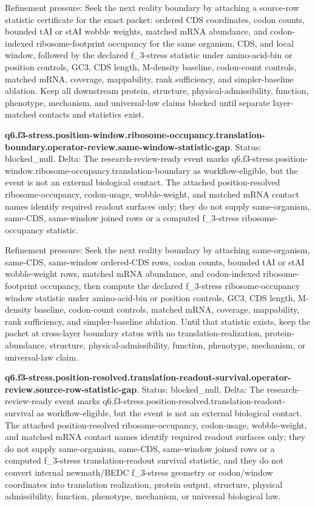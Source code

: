Refinement pressure: Seek the next reality boundary by attaching a source-row statistic certificate for the exact packet: ordered CDS coordinates, codon counts, bounded tAI or stAI wobble weights, matched mRNA abundance, and codon-indexed ribosome-footprint occupancy for the same organism, CDS, and local window, followed by the declared f\_3-stress statistic under amino-acid-bin or position controls, GC3, CDS length, M-density baseline, codon-count controls, matched mRNA, coverage, mappability, rank sufficiency, and simpler-baseline ablation. Keep all downstream protein, structure, physical-admissibility, function, phenotype, mechanism, and universal-law claims blocked until separate layer-matched contacts and statistics exist.

\textbf{q6.f3-stress.position-window.ribosome-occupancy.translation-boundary.operator-review.same-window-statistic-gap}. Status: blocked\_null. Delta: The research-review-ready event marks q6.f3-stress.position-window.ribosome-occupancy.translation-boundary as workflow-eligible, but the event is not an external biological contact. The attached position-resolved ribosome-occupancy, codon-usage, wobble-weight, and matched mRNA contact names identify required readout surfaces only; they do not supply same-organism, same-CDS, same-window joined rows or a computed f\_3-stress ribosome-occupancy statistic.

Refinement pressure: Seek the next reality boundary by attaching same-organism, same-CDS, same-window ordered-CDS rows, codon counts, bounded tAI or stAI wobble-weight rows, matched mRNA abundance, and codon-indexed ribosome-footprint occupancy, then compute the declared f\_3-stress ribosome-occupancy window statistic under amino-acid-bin or position controls, GC3, CDS length, M-density baseline, codon-count controls, matched mRNA, coverage, mappability, rank sufficiency, and simpler-baseline ablation. Until that statistic exists, keep the packet at cross-layer boundary status with no translation-realization, protein-abundance, structure, physical-admissibility, function, phenotype, mechanism, or universal-law claim.

\textbf{q6.f3-stress.position-resolved.translation-readout-survival.operator-review.source-row-statistic-gap}. Status: blocked\_null. Delta: The research-review-ready event marks q6.f3-stress.position-resolved.translation-readout-survival as workflow-eligible, but the event is not an external biological contact. The attached position-resolved ribosome-occupancy, codon-usage, wobble-weight, and matched mRNA contact names identify required readout surfaces only; they do not supply same-organism, same-CDS, same-window joined rows or a computed f\_3-stress translation-readout survival statistic, and they do not convert internal newmath/BEDC f\_3-stress geometry or codon/window coordinates into translation realization, protein output, structure, physical admissibility, function, phenotype, mechanism, or universal biological law.

